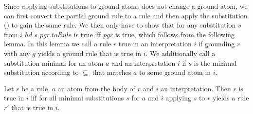     Since applying substitutions to ground atoms does not change a ground atom, we can first convert the partial ground rule to a rule and then apply the substitution (\swapPgrApplySubstitution) to gain the same rule. We then only have to show that for any substitution $s$ from \getSubstitutions $i$ $hd$ \applySubstitutionRule $s$ $pgr.toRule$ is true iff $pgr$ is true, which follows from the following lemma. In this lemma we call a rule $r$ true in an interpretation $i$ if grounding $r$ with any $g$ yields a ground rule that is true in $i$. We additionally call a substitution minimal for an atom $a$ and an interpretation $i$ if $s$ is the minimal substitution according to $\subseteq$ that matches $a$ to some ground atom in $i$.

    \begin{lemma}[\replaceGroundingWithSubstitutionAndGrounding]
        Let $r$ be a rule, $a$ an atom from the body of $r$ and $i$ an interpretation. Then $r$ is true in $i$ iff for all minimal substitutions $s$ for $a$ and $i$ applying $s$ to $r$ yields a rule $r'$ that is true in $i$. 
    \end{lemma}
